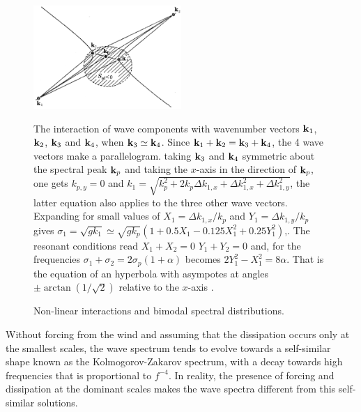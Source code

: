 \begin{figure}
\centerline{\includegraphics[width=0.50\textwidth]{FIGS_CH_SOURCETERMS/Snl_directions_v2.png}}
\caption{Non-linear interactions and bimodal spectral distributions.}{The interaction of wave components with wavenumber vectors 
$\mathbf{k}_1$, $\mathbf{k}_2$, $\mathbf{k}_3$ and $\mathbf{k}_4$, when $\mathbf{k}_3 \simeq \mathbf{k}_4$. Since $\mathbf{k}_1+\mathbf{k}_2=\mathbf{k}_3+\mathbf{k}_4$, the 4 wave vectors make a parallelogram. 
taking $\mathbf{k}_3$ and $\mathbf{k}_4$ symmetric about the spectral peak $\mathbf{k}_p$ and taking the $x$-axis in the direction of   
 $\mathbf{k}_p$, one gets $k_{p,y}=0$ and $k_1 = \sqrt{k_p^2+ 2 k_p \Delta k_{1,x}+ \Delta k_{1,x}^2+\Delta k_{1,y}^2}$, the latter equation also 
applies to the three other wave vectors. Expanding for small values of 
$X_1=\Delta k_{1,x}/k_p$ and $Y_1=\Delta k_{1,y}/k_p$ gives $\sigma_1 =\sqrt{g k_1} \simeq \sqrt{g k_p} \left( 1 +0.5 X_1 - 0.125 X_1^2 + 0.25 Y_1^2 \right)$,.
The resonant conditions read $X_1+X_2=0$ $Y_1+Y_2=0$ and, for the frequencies $\sigma_1+\sigma_2=2 \sigma_p (1+\alpha)$ becomes 
$2 Y_1^2 - X_1^2 = 8 \alpha$. That is the equation of an hyperbola with asympotes at angles 
$ \pm \arctan(1/\sqrt{2})$ relative to the $x$-axis \citep[figure adapted from][]{Longuet-Higgins1976}
.} \label{fig_Snl_dir}
\end{figure}


Without forcing from the wind and assuming that the dissipation occurs only at the smallest scales, the wave spectrum tends to evolve 
towards a self-similar shape known as the Kolmogorov-Zakarov spectrum, with a decay towards high frequencies that is proportional to $f^{-4}$. 
In reality, the presence of forcing and dissipation at the dominant scales makes the wave spectra different from this self-similar solutions. 

